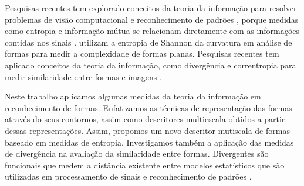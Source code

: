 \begin{comment}
A demanda por novas maneiras de gerenciar e buscar informação multimidia surgiu com a popularização da internet, com a maior disponibilidade de dispositivos de captura de imagens e com a diminuição dos custos dos meios de armazenamento; aspectos esses que contribuíram para um volume crescente de imagens digitais disponibilizadas para as mais diversas finalidades.

Neste contexto, uma nova linha de pesquisa de sistemas de busca de informação desponta, denominada de recuperação de imagens pelo conteúdo ou, do inglês, \foreignlanguage{english}{\emph{Content-Based Image Retrieval}} (\emph{CBIR}). 
\end{comment}

Pesquisas recentes tem explorado conceitos da teoria da informação para resolver problemas de visão computacional e reconhecimento de padrões \cite{Escolano:2009}, porque medidas como entropia e informação mútua se relacionam diretamente com as informações contidas nos sinais \cite{Principe:2011}.  utilizam a entropia de Shannon da curvatura em análise de formas para medir a complexidade de formas planas. Pesquisas recentes tem aplicado conceitos da teoria da informação, como divergência e correntropia \cite{1716783} para medir similaridade entre formas e imagens \cite{Principe:2014,Zang:2014}.


Neste trabalho aplicamos algumas medidas da teoria da informação em reconhecimento de formas. Enfatizamos as técnicas de representação das formas através do seus contornos, assim como descritores multiescala obtidos a partir dessas representações. Assim, propomos um novo descritor mutiscala de formas baseado em medidas de entropia. Investigamos também a aplicação das medidas de divergência na avaliação da similaridade entre formas. Divergentes são funcionais que medem a distância existente entre modelos estatísticos que são utilizadas em processamento de sinais e reconhecimento de padrões \cite{Basseville1989349}.   

\begin{comment}
A demanda por novas maneiras de gerenciar e buscar informação multimidia surgiu com a popularização da internet, com a maior disponibilidade de dispositivos de captura de imagens e com a diminuição dos custos dos meios de armazenamento; aspectos esses que contribuíram para um volume crescente de imagens digitais disponibilizadas para as mais diversas finalidades.

Neste contexto, uma nova linha de pesquisa de sistemas de busca de informação desponta, denominada de recuperação de imagens pelo conteúdo ou, do inglês, \foreignlanguage{english}{\emph{Content-Based Image Retrieval}} (\emph{CBIR}). 
\end{comment}

